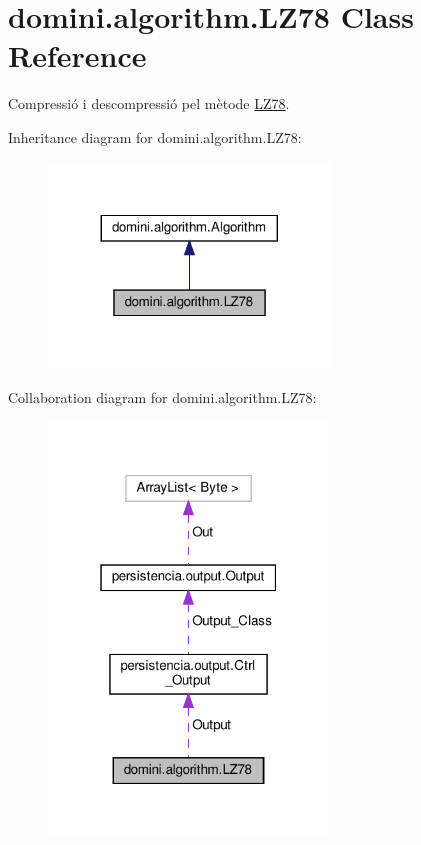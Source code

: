\hypertarget{classdomini_1_1algorithm_1_1LZ78}{}\section{domini.\+algorithm.\+L\+Z78 Class Reference}
\label{classdomini_1_1algorithm_1_1LZ78}


Compressió i descompressió pel mètode \hyperlink{classdomini_1_1algorithm_1_1LZ78}{L\+Z78}.  




Inheritance diagram for domini.\+algorithm.\+L\+Z78\+:\nopagebreak
\begin{figure}[H]
\begin{center}
\leavevmode
\includegraphics[width=212pt]{classdomini_1_1algorithm_1_1LZ78__inherit__graph}
\end{center}
\end{figure}


Collaboration diagram for domini.\+algorithm.\+L\+Z78\+:\nopagebreak
\begin{figure}[H]
\begin{center}
\leavevmode
\includegraphics[width=211pt]{classdomini_1_1algorithm_1_1LZ78__coll__graph}
\end{center}
\end{figure}
